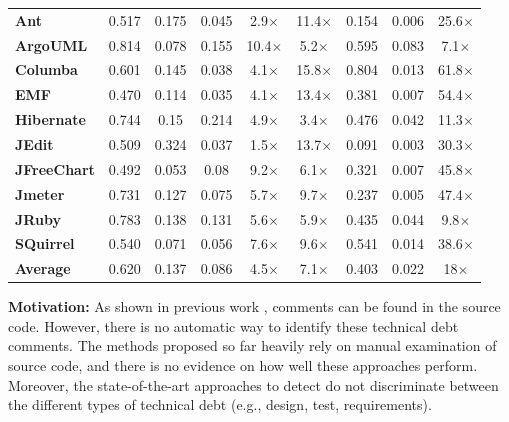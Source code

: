 \begin{table}[!thb]
\begin{center}
\begin{tabular}{l| c c c c c| c c c}
        \midrule                                                  
        \textbf{Ant}          &  0.517  &  0.175 & 0.045 &  2.9$\times$   &  11.4$\times$  & 0.154  &  0.006  & 25.6$\times$  \\
        \textbf{ArgoUML}      &  0.814  &  0.078 & 0.155 &  10.4$\times$  &  5.2$\times$   & 0.595  &  0.083  & 7.1$\times$   \\
        \textbf{Columba}      &  0.601  &  0.145 & 0.038 &  4.1$\times$   &  15.8$\times$  & 0.804  &  0.013  & 61.8$\times$  \\
        \textbf{EMF}          &  0.470  &  0.114 & 0.035 &  4.1$\times$   &  13.4$\times$  & 0.381  &  0.007  & 54.4$\times$  \\
        \textbf{Hibernate}    &  0.744  &   0.15 & 0.214 &  4.9$\times$   &  3.4$\times$   & 0.476  &  0.042  & 11.3$\times$  \\
        \textbf{JEdit}        &  0.509  &  0.324 & 0.037 &  1.5$\times$   &  13.7$\times$  & 0.091  &  0.003  & 30.3$\times$  \\
        \textbf{JFreeChart}   &  0.492  &  0.053 &  0.08 &  9.2$\times$   &  6.1$\times$   & 0.321  &  0.007  & 45.8$\times$  \\
        \textbf{Jmeter}       &  0.731  &  0.127 & 0.075 &  5.7$\times$   &  9.7$\times$   & 0.237  &  0.005  & 47.4$\times$  \\
        \textbf{JRuby}        &  0.783  &  0.138 & 0.131 &  5.6$\times$   &  5.9$\times$   & 0.435  &  0.044  & 9.8$\times$   \\
        \textbf{SQuirrel}     &  0.540  &  0.071 & 0.056 &  7.6$\times$   &  9.6$\times$   & 0.541  &  0.014  & 38.6$\times$  \\
        \midrule 
        \textbf{Average}      &  0.620  & 0.137 & 0.086 &   4.5$\times$   & 7.1$\times$     & 0.403  &  0.022  & 18$\times$  \\ 
        \bottomrule
        \end{tabular}
    \end{center}    
\end{table}

\vspace{3mm}
\noindent\rqi
\vspace{3mm}

\noindent \textbf{Motivation:} As shown in previous work \cite{Potdar2014ICSME, Maldonado2015MTD}, \SATD comments can be found in the source code. However, there is no automatic way to identify these technical debt comments. The methods proposed so far heavily rely on manual examination of source code, and there is no evidence on how well these approaches perform. Moreover, the state-of-the-art approaches to detect \SATD do not discriminate between the different types of technical debt (e.g., design, test, requirements).

